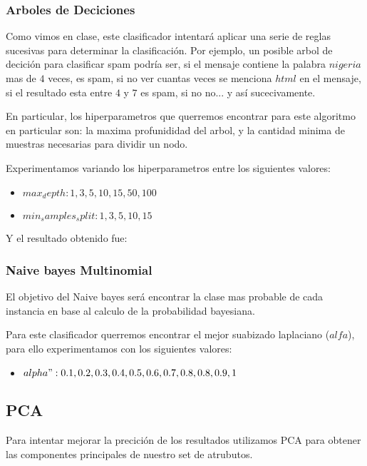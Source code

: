 \subsubsection{Arboles de Deciciones}

Como vimos en clase, este clasificador intentará aplicar una serie de reglas sucesivas para determinar la clasificación. Por ejemplo, un posible arbol de decición para clasificar spam podría ser, si el mensaje contiene la palabra $nigeria$ mas de $4$ veces, es spam, si no ver cuantas veces se menciona $html$ en el mensaje, si el resultado esta entre $4$ y $7$ es spam, si no no... y así sucecivamente.

En particular, los hiperparametros que querremos encontrar para este algoritmo en particular son: la maxima profunididad del arbol, y la cantidad minima de muestras necesarias para dividir un nodo.

Experimentamos variando los hiperparametros entre los siguientes valores:

\begin{itemize}
\item $max_depth: 1,3,5,10,15,50,100$ 
\item $min_samples_split: 1,3,5,10,15$
\end{itemize}

Y el resultado obtenido fue:

\terminar

\subsubsection{Naive bayes Multinomial}

El objetivo del Naive bayes será encontrar la clase mas probable de cada instancia en base al calculo de la probabilidad bayesiana. 

Para este clasificador querremos encontrar el mejor suabizado laplaciano ($alfa$), para ello experimentamos con los siguientes valores:
\begin{itemize}
\item $alpha": 0.1,0.2,0.3,0.4,0.5,0.6,0.7,0.8,0.8,0.9,1$
\end{itemize}


\subsection{PCA}

Para intentar mejorar la precición de los resultados utilizamos PCA para obtener las componentes principales de nuestro set de atrubutos.